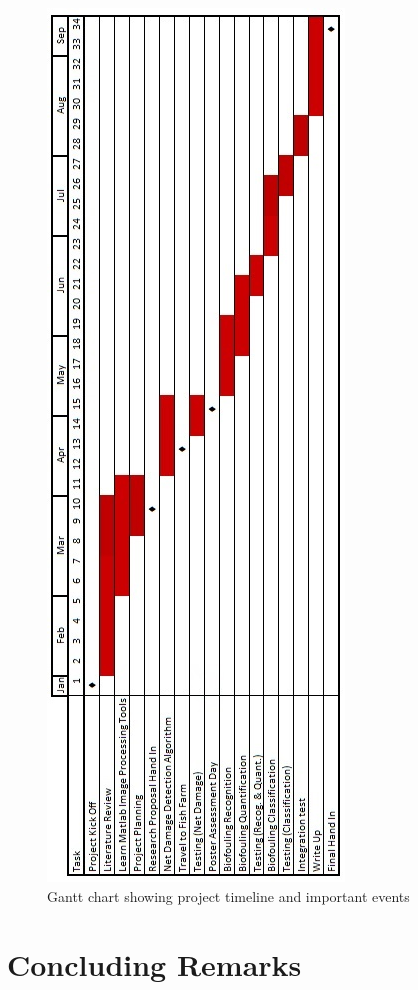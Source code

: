 \documentclass[11.5pt, twoside, a4paper]{article}
\begin{document}
\begin{figure}
\begin{center}
\includegraphics{Gantt.jpg}
\caption{Gantt chart showing project timeline and important events \label{fig:gantt}}
\end{center}
\end{figure}

\section{Concluding Remarks}
\end{document}
